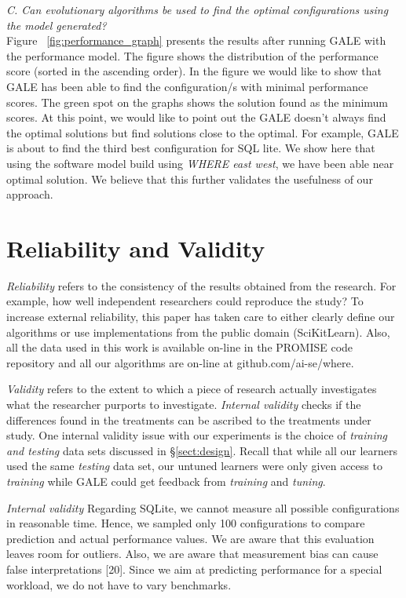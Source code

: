 \documentclass{sig-alternative}
\newcommand{\tion}[1]{\S\ref{sect:#1}}
\begin{document}
\textit{C. Can evolutionary algorithms be used to find the optimal
configurations using the model generated?}
\\
Figure ~\ref{fig:performance_graph} presents the results after running GALE with the performance model. The figure shows the distribution of the performance score (sorted in the ascending order). In the figure we would like to show that GALE has been able to find the configuration/s with minimal performance scores. The green spot on the graphs shows the solution found as the minimum scores. At this point, we would like to point out the GALE doesn't always find the optimal solutions but find solutions close to the optimal. For example, GALE is about to find the third best configuration for SQL lite. We show here that using the software model build using \textit{WHERE east west}, we have been able near optimal solution. We believe that this further validates the usefulness of our approach.  


 
 
\section{Reliability and Validity}\label{sect:construct}


{\em Reliability} refers to the consistency of the results obtained
from the research.  For example,   how well independent researchers
could reproduce the study? To increase external
reliability, this paper has taken care to either  clearly define our
algorithms or use implementations from the public domain
(SciKitLearn). Also, all the data used in this work is available
on-line in the PROMISE code repository and all our algorithms
are on-line at github.com/ai-se/where.


{\em Validity} refers to the extent to which a piece of research actually
investigates what the researcher purports to investigate.
{\em Internal validity} checks if the differences found in
the treatments can be ascribed to the treatments under study. 
One internal validity issue with our experiments is the choice
of {\em training and testing} data sets discussed in 
\tion{design}. Recall that while all our learners used the same
{\em testing} data set, our untuned learners were only given
access to {\em training} while GALE could get feedback from
{\em training} and
{\em tuning}.  

{\em Internal validity}
Regarding SQLite, we cannot measure all possible configurations in reasonable time. Hence, we sampled only 100 configurations to compare prediction and actual performance values. We are aware that this evaluation leaves room for outliers.
Also, we are aware that measurement bias can cause false interpretations [20]. Since we aim at predicting performance for a special workload, we do not have to vary benchmarks.
\end{document}
